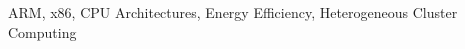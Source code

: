 \begin{IEEEkeywords}
	ARM, x86, CPU Architectures, Energy Efficiency, Heterogeneous Cluster Computing
\end{IEEEkeywords}
